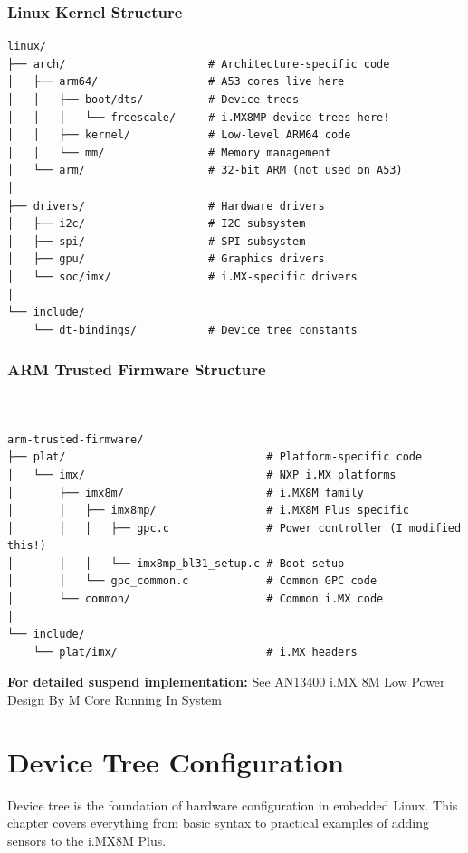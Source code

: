 \documentclass[12pt,a4paper]{report}
\begin{document}
\subsection{Linux Kernel Structure}
\begin{verbatim}
linux/
├── arch/                      # Architecture-specific code
│   ├── arm64/                 # A53 cores live here
│   │   ├── boot/dts/          # Device trees
│   │   │   └── freescale/     # i.MX8MP device trees here!
│   │   ├── kernel/            # Low-level ARM64 code
│   │   └── mm/                # Memory management
│   └── arm/                   # 32-bit ARM (not used on A53)
│
├── drivers/                   # Hardware drivers
│   ├── i2c/                   # I2C subsystem
│   ├── spi/                   # SPI subsystem
│   ├── gpu/                   # Graphics drivers
│   └── soc/imx/               # i.MX-specific drivers
│
└── include/
    └── dt-bindings/           # Device tree constants

\end{verbatim}
\subsection{ARM Trusted Firmware Structure}

\begin{verbatim}
    

arm-trusted-firmware/
├── plat/                               # Platform-specific code
│   └── imx/                            # NXP i.MX platforms
│       ├── imx8m/                      # i.MX8M family
│       │   ├── imx8mp/                 # i.MX8M Plus specific
│       │   │   ├── gpc.c               # Power controller (I modified this!)
│       │   │   └── imx8mp_bl31_setup.c # Boot setup
│       │   └── gpc_common.c            # Common GPC code
│       └── common/                     # Common i.MX code
│
└── include/
    └── plat/imx/                       # i.MX headers
\end{verbatim}

\begin{docref}
\textbf{For detailed suspend implementation:} See AN13400 i.MX 8M Low Power Design By M Core Running In System
\end{docref}

\chapter{Device Tree Configuration}

Device tree is the foundation of hardware configuration in embedded Linux. This chapter covers everything from basic syntax to practical examples of adding sensors to the i.MX8M Plus.
\end{document}

